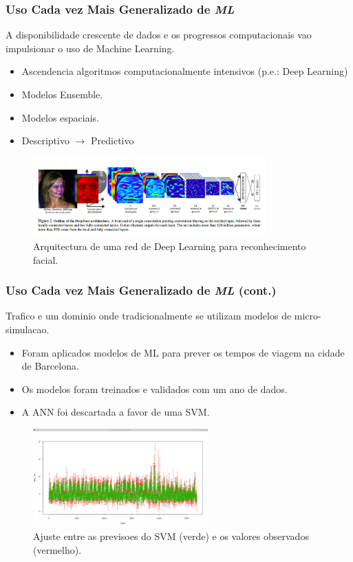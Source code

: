 \documentclass[hyperref={pdfpagelabels=true}]{beamer}
\begin{document}
\begin{frame}
\frametitle{Uso Cada vez Mais Generalizado de \textit{ML}}
A disponibilidade crescente de dados e os progressos computacionais vao impulsionar o uso de Machine Learning.
      \begin{itemize}      
        \item<2->Ascendencia algoritmos computacionalmente intensivos (p.e.: Deep Learning)%
        \item<3->Modelos Ensemble.%
        \item<4->Modelos espaciais.%
        \item<5->Descriptivo $\rightarrow$ Predictivo
      \end{itemize}                
    \begin{figure}   
         \includegraphics[width=0.8\textwidth]{deep.png}\\
         \tiny{Arquitectura de uma red de Deep Learning para reconhecimento facial.}
    \end{figure} 
\end{frame}

\begin{frame}
\frametitle{Uso Cada vez Mais Generalizado de \textit{ML} (cont.)}

    Trafico e um dominio onde tradicionalmente se utilizam modelos de micro-simulacao.
      \begin{itemize}         
        \item<2->Foram aplicados modelos de ML para prever os tempos de viagem na cidade de Barcelona.
        \item<3->Os modelos foram treinados e validados com um ano de dados.
        \item<4->A ANN foi descartada a favor de uma SVM.
       \end{itemize}            
          
        \begin{figure}   
         \includegraphics[width=0.6\textwidth]{prediction.png}\\
         \tiny{Ajuste entre as previsoes do SVM (verde) e os valores observados (vermelho).}
    \end{figure} 


\end{frame}
\end{document}
